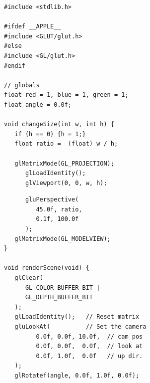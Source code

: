 
\begin{frame}[fragile]
%
%
\begin{codebox}
\begin{verbatim}
#include <stdlib.h>

#ifdef __APPLE__
#include <GLUT/glut.h>
#else
#include <GL/glut.h>
#endif

// globals
float red = 1, blue = 1, green = 1;
float angle = 0.0f;

void changeSize(int w, int h) {
   if (h == 0) {h = 1;}
   float ratio =  (float) w / h;
   
   glMatrixMode(GL_PROJECTION);
      glLoadIdentity();
      glViewport(0, 0, w, h);
\end{verbatim}
\end{codebox}
%
\begin{codebox}[... Fortsetzung]
\begin{verbatim}
      gluPerspective(
         45.0f, ratio, 
         0.1f, 100.0f
      );
   glMatrixMode(GL_MODELVIEW);
}

void renderScene(void) {
   glClear(
      GL_COLOR_BUFFER_BIT | 
      GL_DEPTH_BUFFER_BIT
   );
   glLoadIdentity();   // Reset matrix
   gluLookAt(          // Set the camera
         0.0f, 0.0f, 10.0f,  // cam pos
         0.0f, 0.0f,  0.0f,  // look at
         0.0f, 1.0f,  0.0f   // up dir.
   );
   glRotatef(angle, 0.0f, 1.0f, 0.0f);
\end{verbatim}
\end{codebox}
%
\end{frame}


